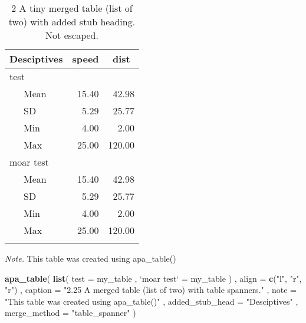 \documentclass[man]{apa6}
\newenvironment{Shaded}{\begin{snugshade}}{\end{snugshade}}
\newcommand{\KeywordTok}[1]{\textcolor[rgb]{0.13,0.29,0.53}{\textbf{#1}}}
\newcommand{\DataTypeTok}[1]{\textcolor[rgb]{0.13,0.29,0.53}{#1}}
\newcommand{\StringTok}[1]{\textcolor[rgb]{0.31,0.60,0.02}{#1}}
\newcommand{\NormalTok}[1]{#1}
\begin{document}
\begin{table}[tbp]
\begin{center}
\begin{threeparttable}
\caption{\label{tab:unnamed-chunk-3}2 A tiny merged table (list of two) with added stub heading. Not escaped.}
\tiny{
\begin{tabular}{lrr}
\toprule
Desciptives & \multicolumn{1}{c}{speed} & \multicolumn{1}{c}{dist}\\
\midrule
test &  & \\
\ \ \ Mean & 15.40 & 42.98\\
\ \ \ SD & 5.29 & 25.77\\
\ \ \ Min & 4.00 & 2.00\\
\ \ \ Max & 25.00 & 120.00\\
moar test &  & \\
\ \ \ Mean & 15.40 & 42.98\\
\ \ \ SD & 5.29 & 25.77\\
\ \ \ Min & 4.00 & 2.00\\
\ \ \ Max & 25.00 & 120.00\\
\bottomrule
\addlinespace
\end{tabular}
}
\begin{tablenotes}[para]
\normalsize{\textit{Note.} This table was created using apa\_table()}
\end{tablenotes}
\end{threeparttable}
\end{center}
\end{table}

\begin{Shaded}
\begin{Highlighting}[]
\KeywordTok{apa_table}\NormalTok{(}
  \KeywordTok{list}\NormalTok{(}
    \DataTypeTok{test =}\NormalTok{ my_table}
\NormalTok{    , }\StringTok{`}\DataTypeTok{moar test}\StringTok{`}\NormalTok{ =}\StringTok{ }\NormalTok{my_table}
\NormalTok{  )}
\NormalTok{  , }\DataTypeTok{align =} \KeywordTok{c}\NormalTok{(}\StringTok{"l"}\NormalTok{, }\StringTok{"r"}\NormalTok{, }\StringTok{"r"}\NormalTok{)}
\NormalTok{  , }\DataTypeTok{caption =} \StringTok{"2.25 A merged table (list of two) with table spanners."}
\NormalTok{  , }\DataTypeTok{note =} \StringTok{"This table was created using apa_table()"}
\NormalTok{  , }\DataTypeTok{added_stub_head =} \StringTok{"Desciptives"}
\NormalTok{  , }\DataTypeTok{merge_method =} \StringTok{"table_spanner"}
\NormalTok{)}
\end{Highlighting}
\end{Shaded}
\end{document}
